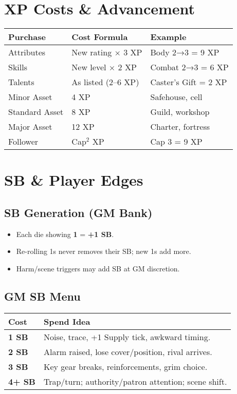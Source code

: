 \begin{multicols}{2}
\section{XP Costs \& Advancement}
\begin{center}
\begin{tabular}{lll}
\toprule
\textbf{Purchase} & \textbf{Cost Formula} & \textbf{Example} \\
\midrule
Attributes & New rating × 3 XP & Body 2→3 = 9 XP \\
Skills & New level × 2 XP & Combat 2→3 = 6 XP \\
Talents & As listed (2–6 XP) & Caster's Gift = 2 XP \\
Minor Asset & 4 XP & Safehouse, cell \\
Standard Asset & 8 XP & Guild, workshop \\
Major Asset & 12 XP & Charter, fortress \\
Follower & Cap$^{2}$ XP & Cap 3 = 9 XP \\
\bottomrule
\end{tabular}
\end{center}

\section{SB \& Player Edges}
\label{qr:edges}

\subsection*{SB Generation (GM Bank)}
\begin{itemize}
  \item Each die showing \textbf{1} = \textbf{+1 SB}.
  \item Re-rolling 1s never removes their SB; new 1s add more.
  \item Harm/scene triggers may add SB at GM discretion.
\end{itemize}

\subsection*{GM SB Menu}
\begin{center}
\begin{tabular}{lp{7.2cm}}
\toprule
\textbf{Cost} & \textbf{Spend Idea} \\
\midrule
\textbf{1 SB} & Noise, trace, +1 Supply tick, awkward timing. \\
\textbf{2 SB} & Alarm raised, lose cover/position, rival arrives. \\
\textbf{3 SB} & Key gear breaks, reinforcements, grim choice. \\
\textbf{4+ SB} & Trap/turn; authority/patron attention; scene shift. \\
\bottomrule
\end{tabular}
\end{center}


\end{multicols}
